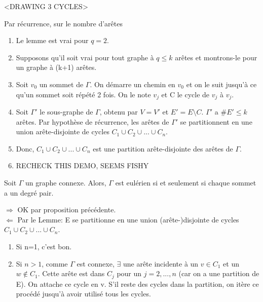 \begin{exmp}
<DRAWING 3 CYCLES>\\
\end{exmp}

\begin{demo}
Par récurrence, sur le nombre d'arêtes
	\begin{enumerate}
		\item Le lemme est vrai pour $q=2$.
		\item Supposons qu'il soit vrai pour tout graphe à $q \leq k$ arêtes et montrons-le pour un graphe à (k+1) arêtes.
		\item Soit $v_{0}$ un sommet de $\Gamma$. On démarre un chemin en $v_{0}$ et on le suit jusqu'à ce qu'un sommet soit répété 2 fois. On le note $v_{j}$ et C le cycle de $v_{j}$ à $v_{j}$.
		\item Soit ${\Gamma}'$ le sous-graphe de $\Gamma$, obtenu par $V={V}'$ et ${E}'=E \setminus C$. ${\Gamma}'$ a $\#{E}' \leq k$ arêtes. Par hypothèse de récurrence, les arêtes de ${\Gamma}'$ se partitionnent en une union arête-disjointe de cycles $C_{1} \cup C_{2} \cup ... \cup C_{n}$.
		\item Donc, $C_{1} \cup C_{2} \cup ... \cup C_{n}$ est une partition arête-disjointe des arêtes de $\Gamma$.
		\item RECHECK THIS DEMO, SEEMS FISHY\\
	\end{enumerate}
\end{demo}

\begin{thrm}
Soit $\Gamma$ un graphe connexe. Alors, $\Gamma$ est eulérien si et seulement si chaque sommet a un degré pair.\\
\end{thrm}

\begin{demo}
$\Rightarrow$ OK par proposition précédente.\\
$\Leftarrow$ Par le Lemme: E se partitionne en une union (arête-)disjointe de cycles $C_{1} \cup C_{2} \cup ... \cup C_{n}$.
	\begin{enumerate}
		\item Si n=1, c'est bon.
		\item Si $n>1$, comme $\Gamma$ est connexe, $\exists$ une arête incidente à un $v \in C_{1}$ et un $w \notin C_{1}$. Cette arête est dans $C_{j}$ pour un $j=2,...,n$ (car on a une partition de E). On attache ce cycle en v. S'il reste des cycles dans la partition, on itère ce procédé jusqu'à avoir utilisé tous les cycles.\\
	\end{enumerate}
\end{demo}


